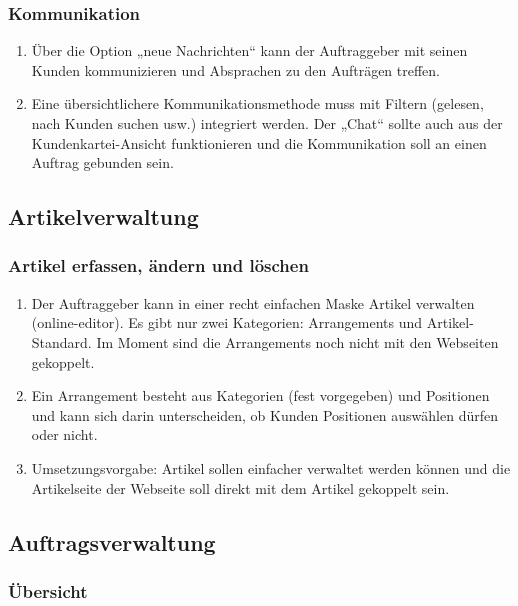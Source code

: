 \subsubsection{Kommunikation}

\begin{enumerate}
	\item Über die Option „neue Nachrichten“ kann der Auftraggeber mit seinen Kunden kommunizieren und Absprachen zu den Aufträgen treffen.
	\item Eine übersichtlichere Kommunikationsmethode muss mit Filtern (gelesen, nach Kunden suchen usw.) integriert werden. Der „Chat“ sollte auch aus der Kundenkartei-Ansicht funktionieren und die Kommunikation soll an einen Auftrag gebunden sein.
\end{enumerate} 


\subsection{Artikelverwaltung}

\subsubsection{Artikel erfassen, ändern und löschen}

\begin{enumerate}
	\item Der Auftraggeber kann in einer recht einfachen Maske Artikel verwalten (online-editor). Es gibt nur zwei Kategorien: Arrangements und Artikel-Standard. Im Moment sind die Arrangements noch nicht mit den Webseiten gekoppelt.
	\item Ein Arrangement besteht aus Kategorien (fest vorgegeben) und Positionen und kann sich darin unterscheiden, ob Kunden Positionen auswählen dürfen oder nicht.
	\item Umsetzungsvorgabe: Artikel sollen einfacher verwaltet werden können und die Artikelseite der Webseite soll direkt mit dem Artikel gekoppelt sein.
\end{enumerate} 


\subsection{Auftragsverwaltung}

\subsubsection{Übersicht}

